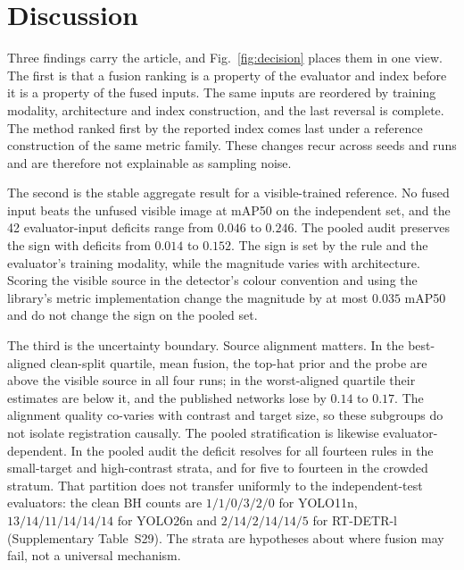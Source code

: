 \documentclass[10pt,a4paper]{article}
\begin{document}
\section{Discussion}
\label{sec:discussion}

\begin{sloppypar}
Three findings carry the article, and Fig.~\ref{fig:decision} places them in one
view. The first is that a fusion ranking is a property of the
evaluator and index before it is a property of the fused inputs. The same inputs are
reordered by training modality, architecture and index construction, and the last
reversal is complete. The method ranked first by the reported index comes last under a
reference construction of the same metric family. These changes recur across seeds and
runs and are therefore not explainable as sampling noise.

The second is the stable aggregate result for a visible-trained reference. No fused
input beats the unfused visible image at mAP50 on the independent set, and the 42
evaluator-input deficits range from $0.046$ to $0.246$. The pooled audit preserves
the sign with deficits from $0.014$ to $0.152$. The sign is set by the rule and the evaluator's
training modality, while the magnitude varies with architecture. Scoring the visible
source in the detector's colour convention and using the library's metric implementation
change the magnitude by at most $0.035$ mAP50 and do not change the sign on the pooled
set.

The third is the uncertainty boundary. Source alignment matters. In the best-aligned
clean-split quartile, mean fusion, the top-hat prior and the probe are above the
visible source in all four runs; in the worst-aligned quartile their estimates are
below it, and the published networks lose by $0.14$ to $0.17$. The alignment quality
co-varies with contrast and target size, so these subgroups do not isolate registration
causally. The pooled stratification is likewise evaluator-dependent. In the pooled
audit the deficit resolves for all fourteen rules in the small-target and
high-contrast strata, and for five to fourteen in the crowded stratum. That partition
does not transfer uniformly to the independent-test evaluators: the clean BH counts
are $1/1/0/3/2/0$ for YOLO11n, $13/14/11/14/14/14$ for YOLO26n and
$2/14/2/14/14/5$ for RT-DETR-l (Supplementary Table~S29). The strata are hypotheses
about where fusion may fail, not a universal mechanism.

\begin{figure}[!t]\centering


\end{figure}
\end{sloppypar}
\end{document}

